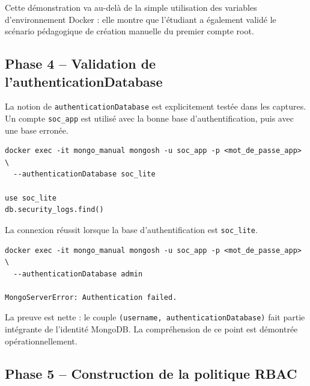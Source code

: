 \documentclass[11pt,a4paper]{article}
\begin{document}
\begin{resultbox}
Cette démonstration va au-delà de la simple utilisation des variables d'environnement Docker : elle montre que l'étudiant a également validé le scénario pédagogique de création manuelle du premier compte root.
\end{resultbox}

\subsection{Phase 4 -- Validation de l'authenticationDatabase}

La notion de \texttt{authenticationDatabase} est explicitement testée dans les captures. Un compte \texttt{soc\_app} est utilisé avec la bonne base d'authentification, puis avec une base erronée.

\begin{tcolorbox}[breakable,colback=CodeBg,colframe=CodeFrame,title=Tests observés]
\begin{Verbatim}[fontsize=\small,breaklines,breakanywhere]
docker exec -it mongo_manual mongosh -u soc_app -p <mot_de_passe_app> \
  --authenticationDatabase soc_lite

use soc_lite
db.security_logs.find()
\end{Verbatim}
\end{tcolorbox}

La connexion réussit lorsque la base d'authentification est \texttt{soc\_lite}.

\begin{tcolorbox}[breakable,colback=CodeBg,colframe=CodeFrame,title=Erreur observée avec mauvaise authDB]
\begin{Verbatim}[fontsize=\small,breaklines,breakanywhere]
docker exec -it mongo_manual mongosh -u soc_app -p <mot_de_passe_app> \
  --authenticationDatabase admin

MongoServerError: Authentication failed.
\end{Verbatim}
\end{tcolorbox}

\begin{resultbox}
La preuve est nette : le couple \texttt{(username, authenticationDatabase)} fait partie intégrante de l'identité MongoDB. La compréhension de ce point est démontrée opérationnellement.
\end{resultbox}

\subsection{Phase 5 -- Construction de la politique RBAC}
\end{document}
